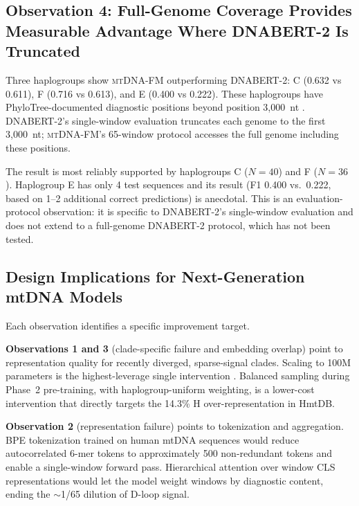 \documentclass[10pt]{article}
\newcommand{\mtdnafm}{\textsc{mtDNA-FM}\xspace}
\begin{document}
\subsection{Observation 4: Full-Genome Coverage Provides Measurable Advantage Where DNABERT-2
Is Truncated}
\label{sec:coverage_advantage}

Three haplogroups show \mtdnafm{} outperforming DNABERT-2: C (0.632 vs 0.611), F (0.716 vs
0.613), and E (0.400 vs 0.222). These haplogroups have PhyloTree-documented diagnostic positions
beyond position 3,000~nt \citep{vanoven2009phylotree}. DNABERT-2's single-window evaluation
truncates each genome to the first 3,000~nt; \mtdnafm{}'s 65-window protocol accesses the full
genome including these positions.

The result is most reliably supported by haplogroups C ($N=40$) and F ($N=36$). Haplogroup E
has only 4 test sequences and its result (F1 0.400 vs.\ 0.222, based on 1--2 additional correct
predictions) is anecdotal. This is an evaluation-protocol observation: it is specific to
DNABERT-2's single-window evaluation and does not extend to a full-genome DNABERT-2 protocol,
which has not been tested.

\subsection{Design Implications for Next-Generation mtDNA Models}
\label{sec:implications}

Each observation identifies a specific improvement target.

\textbf{Observations 1 and 3} (clade-specific failure and embedding overlap) point to
representation quality for recently diverged, sparse-signal clades. Scaling to 100M parameters
is the highest-leverage single intervention \citep{kaplan2020scaling}. Balanced sampling during
Phase~2 pre-training, with haplogroup-uniform weighting, is a lower-cost intervention that
directly targets the 14.3\% H over-representation in HmtDB.

\textbf{Observation 2} (representation failure) points to tokenization and aggregation.
BPE tokenization trained on human mtDNA sequences would reduce autocorrelated 6-mer tokens to
approximately 500 non-redundant tokens \citep{zhou2024dnabert2} and enable a single-window
forward pass. Hierarchical attention over window CLS representations would let the model weight
windows by diagnostic content, ending the $\sim$1/65 dilution of D-loop signal.
\end{document}
